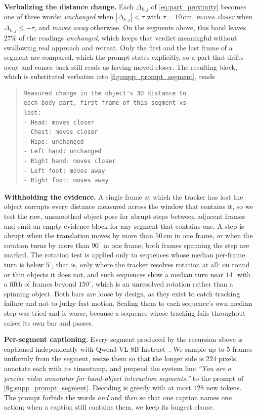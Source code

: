 \noindent\textbf{Verbalizing the distance change.}
Each $\Delta_{k,j}$ of \cref{eq:part_proximity} becomes one of three words:
\textit{unchanged} when $|\Delta_{k,j}|<\tau$ with $\tau=10$\,cm,
\textit{moves closer} when $\Delta_{k,j}\le-\tau$, and \textit{moves away}
otherwise.  On the segments above, this band leaves $27\%$ of the readings
\textit{unchanged}, which keeps that verdict meaningful without swallowing real
approach and retreat.  Only the first and the last frame of a segment are
compared, which the prompt states explicitly, so a part that drifts away and
comes back still reads as having moved closer.  The resulting block, which is
substituted verbatim into \cref{fig:supp_prompt_segment}, reads

\begin{quote}\small\begin{verbatim}
Measured change in the object's 3D distance to
each body part, first frame of this segment vs
last:
- Head: moves closer
- Chest: moves closer
- Hips: unchanged
- Left hand: unchanged
- Right hand: moves closer
- Left foot: moves away
- Right foot: moves away
\end{verbatim}
\end{quote}

\noindent\textbf{Withholding the evidence.}
A single frame at which the tracker has lost the object corrupts every distance
measured across the window that contains it, so we test the raw, unsmoothed
object pose for abrupt steps between adjacent frames and emit an empty evidence
block for any segment that contains one.  A step is abrupt when the translation
moves by more than $50$\,cm in one frame, or when the rotation turns by more than
$90^\circ$ in one frame; both frames spanning the step are marked.  The
rotation test is applied only to sequences whose median per-frame turn is below
$5^\circ$, that is, only where the tracker resolves rotation at all: on round or
thin objects it does not, and such sequences show a median turn near $14^\circ$
with a fifth of frames beyond $150^\circ$, which is an unresolved rotation
rather than a spinning object.  Both bars are loose by design, as they exist to
catch tracking failure and not to judge fast motion.  Scaling them to each
sequence's own median step was tried and is worse, because a sequence whose
tracking fails throughout raises its own bar and passes.

\noindent\textbf{Per-segment captioning.}
Every segment produced by the recursion above is captioned independently with
Qwen3-VL-8B-Instruct~\cite{bai2025qwen3}.  We sample up to $5$ frames uniformly
from the segment, resize them so that the longer side is $224$ pixels, annotate
each with its timestamp, and prepend the system line \textit{``You are a precise
video annotator for hand-object interaction segments.''} to the prompt of
\cref{fig:supp_prompt_segment}.  Decoding is greedy with at most $128$ new
tokens.  The prompt forbids the words \textit{and} and \textit{then} so that one
caption names one action; when a caption still contains them, we keep its longest
clause.

